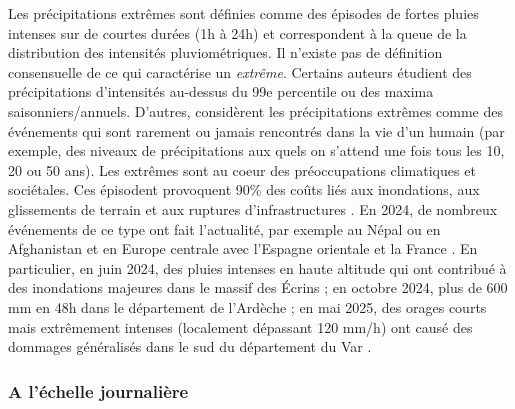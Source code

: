 \documentclass[
  article,
  nofooter,
  noheadings]{jss}
\begin{document}
Les précipitations extrêmes sont définies comme des épisodes de fortes
pluies intenses sur de courtes durées (1h à 24h) et correspondent à la
queue de la distribution des intensités pluviométriques. Il n'existe pas
de définition consensuelle de ce qui caractérise un \emph{extrême}.
Certains auteurs étudient des précipitations d'intensités au-dessus du
99e percentile ou des maxima saisonniers/annuels. D'autres, considèrent
les précipitations extrêmes comme des événements qui sont rarement ou
jamais rencontrés dans la vie d'un humain (par exemple, des niveaux de
précipitations aux quels on s'attend une fois tous les 10, 20 ou 50
ans). Les extrêmes sont au coeur des préoccupations climatiques et
sociétales. Ces épisodent provoquent 90\% des coûts liés aux
inondations, aux glissements de terrain et aux ruptures
d'infrastructures \citep{IPCC_2022_WGIII}. En 2024, de nombreux
événements de ce type ont fait l'actualité, par exemple au Népal ou en
Afghanistan et en Europe centrale avec l'Espagne orientale et la France
\citep{WMO2025}. En particulier, en juin 2024, des pluies intenses en
haute altitude qui ont contribué à des inondations majeures dans le
massif des Écrins \citep{Blanc2024} ; en octobre 2024, plus de 600 mm en
48h dans le département de l'Ardèche
\citep{MeteoFrance2024_episodesArdeches} ; en mai 2025, des orages
courts mais extrêmement intenses (localement dépassant 120 mm/h) ont
causé des dommages généralisés dans le sud du département du Var
\citep{MeteoFrance2025}.

\subsubsection{A l'échelle
journalière}\label{a-luxe9chelle-journaliuxe8re}
\end{document}
